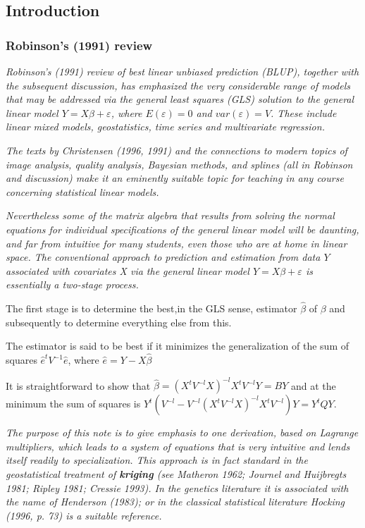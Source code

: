 \documentclass[12pt, a4paper]{report}
\begin{document}
\subsection{Introduction}
\subsubsection{Robinson's (1991) review}
\emph{ Robinson's (1991) review of best linear unbiased prediction (BLUP), together with the subsequent discussion, has emphasized the very considerable range of models that may be addressed via the general least squares (GLS) solution to the general linear model $Y = X\beta + \varepsilon$, where $E(\varepsilon) = 0$ and $var(\varepsilon) = V$. These include linear mixed models, geostatistics, time series and multivariate regression.}


\emph{ The texts by Christensen (1996, 1991) and the connections to modern topics of image analysis, quality analysis, Bayesian methods, and splines (all in Robinson and discussion) make it an eminently suitable topic for teaching in any course concerning statistical linear models. }


\emph{Nevertheless some of the matrix algebra that results from solving the normal equations for individual specifications of the general linear model will be daunting, and far from intuitive for many students, even those who are at home in linear space. The conventional approach to prediction and estimation from data $Y$ associated with covariates X via the general linear model $Y = X\beta + \varepsilon$ is essentially a two-stage process.}

The first stage is to determine the best,in the GLS sense, estimator $\hat{\beta}$ of $\beta$ and subsequently to determine everything else from this.

The estimator is said to be best if it minimizes the generalization of the sum of squares $\hat{e}^{t}V^{-1}\hat{e}$, where $\hat{e} = Y- X\hat{\beta}$

\newpage

It is straightforward to show that $\hat{\beta} = (X^tV^{-l}X)^{-l}X^tV^{-l}Y = BY$ and at the minimum the sum of squares is $Y^{t} (V^{-l}  - V^{-l}(X^tV^{-l}X)^{-l}X^tV^{-l})Y = Y^{t}QY$.\\
\bigskip

\emph{The purpose of this note is to give emphasis to one derivation, based on Lagrange multipliers, which leads to a system of equations that is very intuitive and lends itself readily to specialization. This approach is in fact standard in the geostatistical treatment of \textbf{kriging} (see Matheron 1962; Journel and Huijbregts 1981; Ripley 1981; Cressie 1993). In the genetics literature it is associated with the name of Henderson (1983); or in the classical statistical literature Hocking (1996, p. 73) is a suitable reference.}
\end{document}

